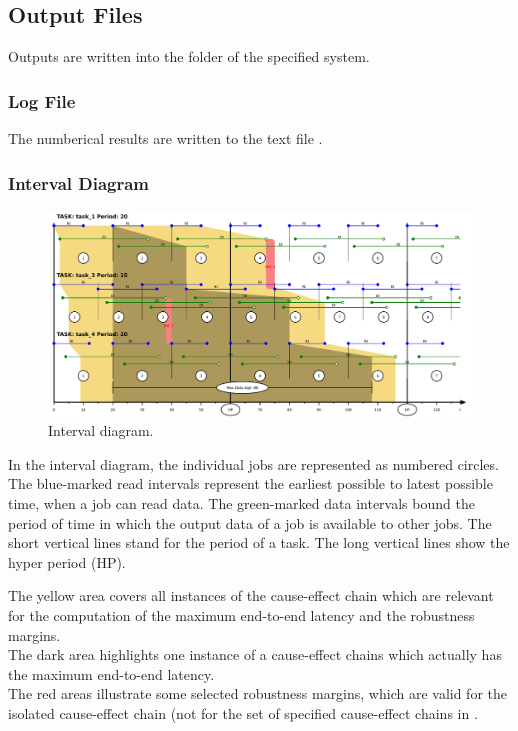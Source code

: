 \newpage
\subsection{Output Files}
\label{sec:outputs}
Outputs are written into the folder of the specified system.

\subsubsection{Log File}
The numberical results are written to the text file 
.

\subsubsection{Interval Diagram}
%
\begin{figure}
		\centering
		\includegraphics[width=415pt]{fig/intervalls.pdf}
		\caption{Interval diagram.}
		\label{fig:interval_diagram}
\end{figure}
%
In the interval diagram, the individual jobs are represented as numbered circles. 
The blue-marked read intervals represent the earliest possible to latest possible time, when a job can read data. 
The green-marked data intervals bound the period of time in which the output data of a job is available to other jobs.
The short vertical lines stand for the period of a task.
The long vertical lines show the hyper period (HP).
\smallskip

The yellow area covers all instances of the cause-effect chain which are relevant for the computation of the maximum end-to-end latency and the robustness margins. \\
The dark area highlights one instance of a cause-effect chains which actually has the maximum end-to-end latency. \\
The red areas illustrate some selected robustness margins, which are valid for the isolated cause-effect chain (not for the set of specified cause-effect chains in .


